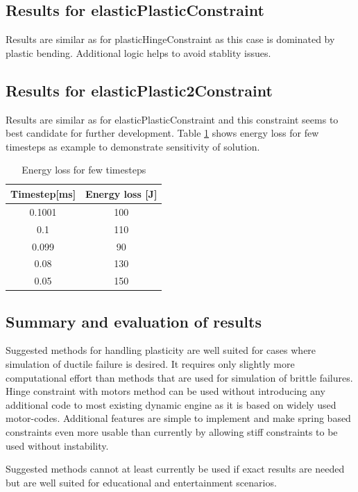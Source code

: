 \subsection{Results for elasticPlasticConstraint}
Results are similar as for plasticHingeConstraint as this case is dominated by plastic bending.
Additional logic helps to avoid stablity issues.

\subsection{Results for elasticPlastic2Constraint}
Results are similar as for elasticPlasticConstraint and this constraint seems to best candidate for further development.
Table \ref{tab:ep2ts} shows energy loss for few timesteps as example to demonstrate sensitivity of solution.

\begin {table}[htb!]
\begin{center}
\begin{tabular}{| c| c|}
\hline
{\bf Timestep[ms]} & {\bf Energy loss [J]}\\  \hline
 0.1001 &  100 \\ \hline
 0.1 &  110 \\ \hline
 0.099 &  90 \\ \hline
 0.08 &  130 \\ \hline
 0.05 &  150 \\ \hline
\end {tabular}
\end{center}
\caption {Energy loss for few timesteps} \label{tab:ep2ts} 
\end {table}

\subsection{Summary and evaluation of results}
Suggested methods for handling plasticity are well suited for cases where simulation of ductile failure is desired.
It requires only slightly more computational effort than methods that are used for simulation of brittle failures.
Hinge constraint with motors method can be used without introducing any additional code to most existing dynamic engine
as it is based on widely used motor-codes. 
Additional features are simple to implement and make spring based constraints even more usable than currently by 
allowing stiff constraints to be used without instability.

Suggested methods cannot at least currently be used if exact results are needed but are well suited for educational and entertainment scenarios.

\cleardoublepage
